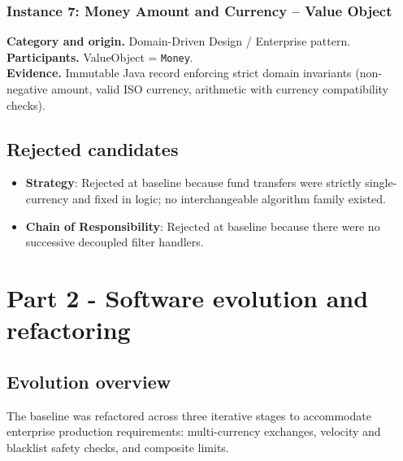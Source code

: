 \documentclass[11pt,a4paper]{article}
\begin{document}
\subsubsection{Instance 7: Money Amount and Currency -- Value Object}
\textbf{Category and origin.} Domain-Driven Design / Enterprise pattern.\\
\textbf{Participants.} ValueObject = \texttt{Money}.\\
\textbf{Evidence.} Immutable Java record enforcing strict domain invariants (non-negative amount, valid ISO currency, arithmetic with currency compatibility checks).

\subsection{Rejected candidates}
\begin{itemize}[noitemsep]
    \item \textbf{Strategy}: Rejected at baseline because fund transfers were strictly single-currency and fixed in logic; no interchangeable algorithm family existed.
    \item \textbf{Chain of Responsibility}: Rejected at baseline because there were no successive decoupled filter handlers.
\end{itemize}

\section{Part 2 - Software evolution and refactoring}

\subsection{Evolution overview}
The baseline was refactored across three iterative stages to accommodate enterprise production requirements: multi-currency exchanges, velocity and blacklist safety checks, and composite limits.
\end{document}
